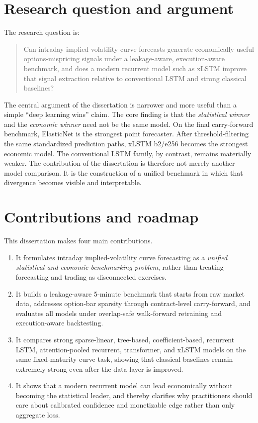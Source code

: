 \documentclass[12pt]{report}
\begin{document}
\section{Research question and argument}
The research question is:

\begin{quote}
Can intraday implied-volatility curve forecasts generate economically useful options-mispricing signals under a leakage-aware, execution-aware benchmark, and does a modern recurrent model such as xLSTM improve that signal extraction relative to conventional LSTM and strong classical baselines?
\end{quote}

The central argument of the dissertation is narrower and more useful than a simple ``deep learning wins'' claim. The core finding is that the \emph{statistical winner} and the \emph{economic winner} need not be the same model. On the final carry-forward benchmark, ElasticNet is the strongest point forecaster. After threshold-filtering the same standardized prediction paths, xLSTM b2/e256 becomes the strongest economic model. The conventional LSTM family, by contrast, remains materially weaker. The contribution of the dissertation is therefore not merely another model comparison. It is the construction of a unified benchmark in which that divergence becomes visible and interpretable.

\section{Contributions and roadmap}
This dissertation makes four main contributions.
\begin{enumerate}[leftmargin=1.3cm]
    \item It formulates intraday implied-volatility curve forecasting as a \emph{unified statistical-and-economic benchmarking problem}, rather than treating forecasting and trading as disconnected exercises.
    \item It builds a leakage-aware 5-minute benchmark that starts from raw market data, addresses option-bar sparsity through contract-level carry-forward, and evaluates all models under overlap-safe walk-forward retraining and execution-aware backtesting.
    \item It compares strong sparse-linear, tree-based, coefficient-based, recurrent LSTM, attention-pooled recurrent, transformer, and xLSTM models on the same fixed-maturity curve task, showing that classical baselines remain extremely strong even after the data layer is improved.
    \item It shows that a modern recurrent model can lead economically without becoming the statistical leader, and thereby clarifies why practitioners should care about calibrated confidence and monetizable edge rather than only aggregate loss.
\end{enumerate}
\end{document}
